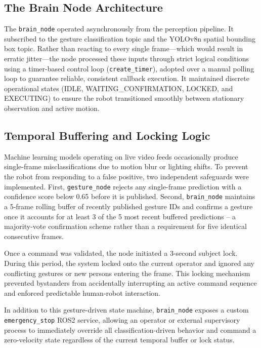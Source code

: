 \subsection{The Brain Node Architecture}
The \texttt{brain\_node} operated asynchronously from the perception pipeline. It subscribed to the gesture classification topic and the YOLOv8n spatial bounding box topic. Rather than reacting to every single frame—which would result in erratic jitter—the node processed these inputs through strict logical conditions using a timer-based control loop (\texttt{create\_timer}), adopted over a manual polling loop to guarantee reliable, consistent callback execution. It maintained discrete operational states (IDLE, WAITING\_CONFIRMATION, LOCKED, and EXECUTING) to ensure the robot transitioned smoothly between stationary observation and active motion.

\subsection{Temporal Buffering and Locking Logic}
\label{sec:temporal_buffering}
Machine learning models operating on live video feeds occasionally produce
single-frame misclassifications due to motion blur or lighting shifts. To prevent the
robot from responding to a false positive, two independent safeguards were
implemented. First, \texttt{gesture\_node} rejects any single-frame prediction with a
confidence score below 0.65 before it is published. Second, \texttt{brain\_node}
maintains a 5-frame rolling buffer of recently published gesture IDs and confirms a
gesture once it accounts for at least 3 of the 5 most recent buffered predictions -- a
majority-vote confirmation scheme rather than a requirement for five identical
consecutive frames.

Once a command was validated, the node initiated a 3-second subject lock. During this period, the system locked onto the current operator and ignored any conflicting gestures or new persons entering the frame. This locking mechanism prevented bystanders from accidentally interrupting an active command sequence and enforced predictable human-robot interaction.

In addition to this gesture-driven state machine, \texttt{brain\_node} exposes a custom \texttt{emergency\_stop} ROS2 service, allowing an operator or external supervisory process to immediately override all classification-driven behavior and command a zero-velocity state regardless of the current temporal buffer or lock status.

